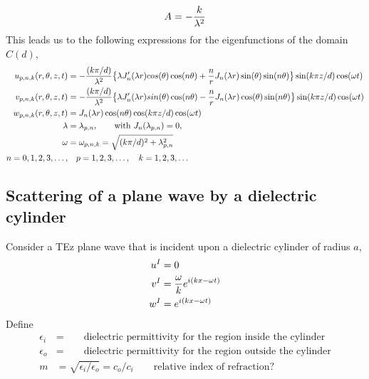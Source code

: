 \documentclass[10pt]{article}
\begin{document}
\[
     A = - { k \over \lambda^2}
\]
This leads us to the following expressions for the eigenfunctions of the domain $C(d)$,
\begin{align*}
  u_{p,n,k}(r,\theta,z,t) &= - { (k\pi/d) \over \lambda^2 }
       \big\{ 
           \lambda J_n'(\lambda r ) cos(\theta)\cos(n \theta) 
                        + {n\over r} J_n(\lambda r ) \sin(\theta) \sin(n \theta)  \big\} 
               \sin(k \pi z/d)  \cos(\omega t)  \\
  v_{p,n,k}(r,\theta,z,t) &=   -{ (k\pi/d) \over \lambda^2} 
      \big\{ \lambda J_n'(\lambda r) sin(\theta)\cos(n \theta)
                 - {n\over r} J_n(\lambda r ) \cos(\theta) \sin(n \theta)  \big\}  
                          \sin(k \pi z/d)  \cos(\omega t) \\
  w_{p,n,k}(r,\theta,z,t) & = J_n( \lambda r ) \cos(n \theta) \cos(k \pi z/d) \cos(\omega t) \\
       \lambda &= \lambda_{p,n}, \qquad \mbox{with $J_n(\lambda_{p,n})=0$,} \\
       \omega &= \omega_{p,n,k} = \sqrt{(k\pi/d)^2 + \lambda_{p,n}^2} \\
        n=0,1,2,3,\ldots,&\quad p=1,2,3,\ldots,\quad k=1,2,3,\ldots
\end{align*}


\clearpage
\subsection{Scattering of a plane wave by a dielectric cylinder}


Consider a TEz plane wave that is incident upon a dielectric cylinder of radius $a$,
\begin{align*}
    u^I &= 0 \\
    v^I &= {\omega \over k} e^{i(k x - \omega t)} \\
    w^I &= e^{i(k x - \omega t)}
\end{align*}
Define
\begin{align*}
    \epsilon_i &= \qquad\mbox{dielectric permittivity for the region inside the cylinder} \\
    \epsilon_o &= \qquad\mbox{dielectric permittivity for the region outside the cylinder}  \\
    m & =\sqrt{\epsilon_i/\epsilon_o} = c_o/c_i  \qquad\mbox{relative index of refraction?} 
\end{align*}

\newcommand{\Jn}{J_n}
\newcommand{\Yn}{Y_n}
\newcommand{\Hn}{H_n}
\end{document}
